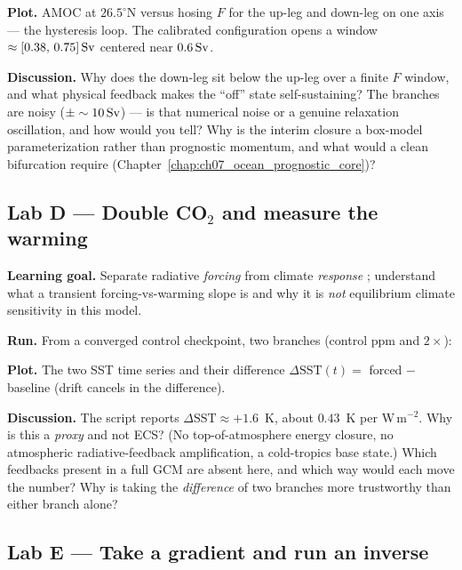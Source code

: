 \textbf{Plot.} AMOC at $26.5^\circ$N versus hosing $F$ for the up-leg and down-leg on one axis ---
the hysteresis loop. The calibrated configuration opens a window $\approx[0.38,\,0.75]\,\mathrm{Sv}$
centered near $0.6\,\mathrm{Sv}$.

\textbf{Discussion.} Why does the down-leg sit below the up-leg over a finite $F$ window, and what
physical feedback makes the ``off'' state self-sustaining? The branches are noisy
($\pm\sim10\,\mathrm{Sv}$) --- is that numerical noise or a genuine relaxation oscillation, and how would
you tell? Why is the interim closure a box-model parameterization rather than prognostic momentum,
and what would a clean bifurcation require (Chapter~\ref{chap:ch07_ocean_prognostic_core})?

\subsection{Lab D --- Double CO$_2$ and measure the warming}

\textbf{Learning goal.} Separate radiative \emph{forcing} from climate \emph{response}
\citep{myhre1998}; understand what a transient forcing-vs-warming slope is and why it is
\emph{not} equilibrium climate sensitivity in this model.

\textbf{Run.} From a converged control checkpoint, two branches (control ppm and $2\times$):
\begin{quote}\small
{}
\end{quote}

\textbf{Plot.} The two SST time series and their difference $\Delta\text{SST}(t)=$ forced $-$
baseline (drift cancels in the difference).

\textbf{Discussion.} The script reports $\Delta\text{SST}\approx+1.6$~K, about
$0.43$~K per W\,m$^{-2}$. Why is this a \emph{proxy} and not ECS? (No top-of-atmosphere energy
closure, no atmospheric radiative-feedback amplification, a cold-tropics base state.) Which
feedbacks present in a full GCM are absent here, and which way would each move the number? Why is
taking the \emph{difference} of two branches more trustworthy than either branch alone?

\subsection{Lab E --- Take a gradient and run an inverse}

